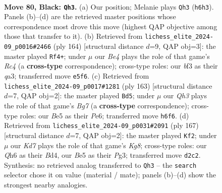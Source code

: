 \documentclass[11pt]{article}
\begin{document}
\clearpage

\begin{figure}[p]\centering
\begin{subfigure}{0.46\textwidth}\centering
\resizebox{\linewidth}{!}{%
\newchessgame
\chessboard[
  setfen={8/8/7q/4b3/8/1p3B2/3k4/6K1 b - - 3 80},
  showmover=false,
  pgfstyle=straightmove, color=movearrow, markmove={h6-h3}
]}
\caption{}
\end{subfigure}\hfill
\begin{subfigure}{0.46\textwidth}\centering
\resizebox{\linewidth}{!}{%
\newchessgame
\chessboard[
  setfen={4K3/8/8/4Q3/2R5/q7/5k2/8 w - - 12 83},
  showmover=false,
  pgfstyle=straightmove, color=movearrow, markmove={c4-f4}
]}
\caption{}
\end{subfigure}
\\[4pt]
\begin{subfigure}{0.46\textwidth}\centering
\resizebox{\linewidth}{!}{%
\newchessgame
\chessboard[
  setfen={8/1k6/3Bp3/8/8/4K3/6b1/8 b - - 60 82},
  showmover=false,
  pgfstyle=straightmove, color=movearrow, markmove={g2-d5}
]}
\caption{}
\end{subfigure}\hfill
\begin{subfigure}{0.46\textwidth}\centering
\resizebox{\linewidth}{!}{%
\newchessgame
\chessboard[
  setfen={8/8/8/8/1K1bB3/6p1/8/6k1 b - - 49 84},
  showmover=false,
  pgfstyle=straightmove, color=movearrow, markmove={g1-f2}
]}
\caption{}
\end{subfigure}
\caption{\textbf{Move 80, Black: \texttt{Qh3}.} (a) Our position; Melanie plays \texttt{Qh3} (\texttt{h6h3}). Panels (b)--(d) are the retrieved master positions whose correspondence most drove this move (highest QAP objective among those that transfer to it). (b) Retrieved from \texttt{lichess\_elite\_2024-09\_p0016\#2466} (ply 164) [structural distance $d$=9, QAP obj=3]: the master played \texttt{Rf4+}; under $\mu$ our \emph{Be4} plays the role of that game's \emph{Rc4} (a \textbf{cross-type} correspondence); cross-type roles: our \emph{b}f3 as their \emph{q}a3; transferred move \texttt{e5f6}. (c) Retrieved from \texttt{lichess\_elite\_2024-09\_p0017\#1281} (ply 163) [structural distance $d$=7, QAP obj=2]: the master played \texttt{Bd5}; under $\mu$ our \emph{Qh3} plays the role of that game's \emph{Bg7} (a \textbf{cross-type} correspondence); cross-type roles: our \emph{B}e5 as their \emph{P}e6; transferred move \texttt{h6f6}. (d) Retrieved from \texttt{lichess\_elite\_2024-09\_p0031\#2091} (ply 167) [structural distance $d$=7, QAP obj=2]: the master played \texttt{Kf2}; under $\mu$ our \emph{Kd7} plays the role of that game's \emph{Kg8}; cross-type roles: our \emph{Q}h6 as their \emph{B}d4, our \emph{B}e5 as their \emph{P}g3; transferred move \texttt{d2c2}. Synthesis: no retrieved analog transferred to \texttt{Qh3} -- the \texttt{search} selector chose it on value (material / mate); panels (b)--(d) show the strongest nearby analogies.}
\label{fig:thought-m159}
\end{figure}
\end{document}
